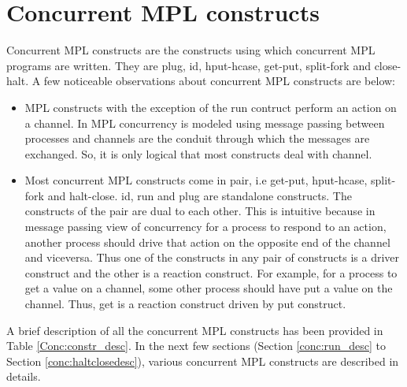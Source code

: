 \documentclass[11pt]{article}
\newcommand{\<}{\langle}
\renewcommand{\>}{\rangle}
\begin{document}
\section {Concurrent MPL constructs}\label{conc:allConsDesc}
Concurrent MPL constructs are the constructs using which concurrent MPL programs are written. They are {\sf plug}, {\sf id}, {\sf hput-hcase}, {\sf get-put}, {\sf split-fork} and {\sf close-halt}. A few noticeable observations about concurrent MPL constructs are below:
\begin{itemize}
  \item MPL constructs with the exception of the {\sf run} contruct perform an action on a channel. In MPL concurrency is modeled using message passing between processes and channels are the conduit through which the messages are exchanged. So, it is only logical that most constructs deal with channel.
  \item Most concurrent MPL constructs come in pair, i.e {\sf get-put}, {\sf hput-hcase}, {\sf split-fork} and {\sf halt-close}. {\sf id}, {\sf run} and {\sf plug} are standalone constructs. The constructs of the pair are dual to each other.
  This is intuitive because in message passing view of concurrency for a process to respond to an action, another process should drive that action on the opposite end of the channel and viceversa. Thus one of the constructs in any pair of constructs is a driver construct and the other is a reaction construct. For example, for a process to get a value on a channel, some other process should have put a value on the channel. Thus, {\sf get} is a reaction construct driven by {\sf put} construct.
\end{itemize}
A brief description of all the concurrent MPL constructs has been provided in Table \ref {Conc:constr_desc}. In the next few sections (Section \ref {conc:run_desc} to Section \ref {conc:haltclosedesc}), various concurrent MPL constructs are described in details.
\end{document}
